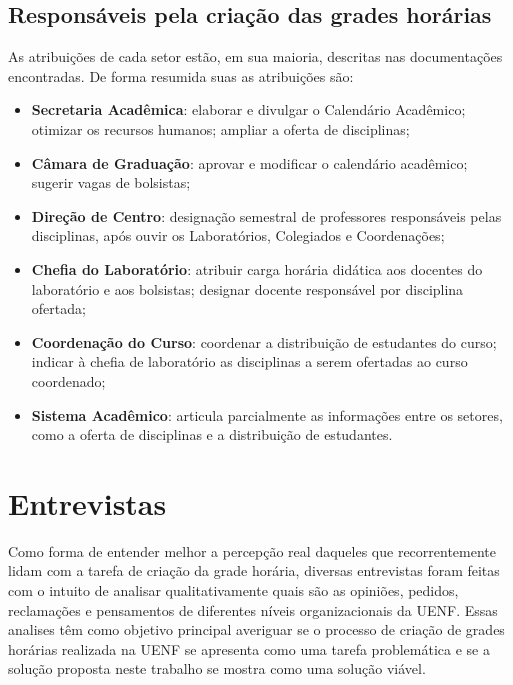 \subsection{Responsáveis pela criação das grades horárias} \label{ssec:responsaveis} %

As atribuições de cada setor estão, em sua maioria, descritas nas documentações encontradas. De forma resumida suas as atribuições são:

\begin{itemize}
  \item \textbf{Secretaria Acadêmica}: elaborar e divulgar o Calendário Acadêmico; otimizar os recursos humanos; ampliar a oferta de disciplinas;
  \item \textbf{Câmara de Graduação}: aprovar e modificar o calendário acadêmico; sugerir vagas de bolsistas;
  \item \textbf{Direção de Centro}: designação semestral de professores responsáveis pelas disciplinas, após ouvir os Laboratórios, Colegiados e Coordenações;
  \item \textbf{Chefia do Laboratório}: atribuir carga horária didática aos docentes do laboratório e aos bolsistas; designar docente responsável por disciplina ofertada;
  \item \textbf{Coordenação do Curso}: coordenar a distribuição de estudantes do curso; indicar à chefia de laboratório as disciplinas a serem ofertadas ao curso coordenado;
  \item \textbf{Sistema Acadêmico}: articula parcialmente as informações entre os setores, como a oferta de disciplinas e a distribuição de estudantes.
\end{itemize}

\section{Entrevistas} \label{sec:entrevistas} %


Como forma de entender melhor a percepção real daqueles que recorrentemente lidam com a tarefa de criação da grade horária, diversas entrevistas foram feitas com o intuito de analisar qualitativamente quais são as opiniões, pedidos, reclamações e pensamentos de diferentes níveis organizacionais da UENF. Essas analises têm como objetivo principal averiguar se o processo de criação de grades horárias realizada na UENF se apresenta como uma tarefa problemática e se a solução proposta neste trabalho se mostra como uma solução viável.

